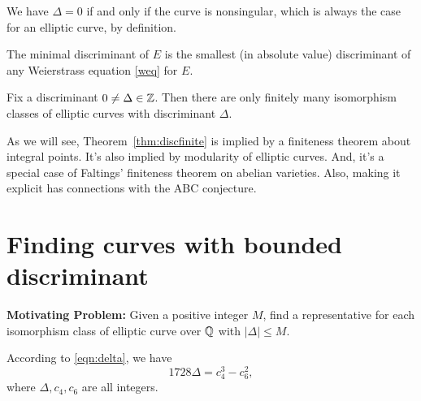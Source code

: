 \documentclass{book}
\begin{document}
We have $\Delta=0$ if and only if the curve is nonsingular, which is
always the case for an elliptic curve, by definition.

\begin{definition}
The minimal discriminant of $E$ is the smallest (in absolute
value) discriminant of any Weierstrass equation \eqref{weq}
for $E$.
\end{definition}


\begin{theorem}\label{thm:discfinite}
Fix a discriminant $0\neq \Delta\in\mathbb{Z}$.
Then there are only finitely many isomorphism classes
of elliptic curves with discriminant $\Delta$.
\end{theorem}
As we will see, Theorem~\ref{thm:discfinite} is
implied by a finiteness theorem about integral
points.  It's also implied by modularity of elliptic curves.
And, it's a special case of Faltings' finiteness
theorem on abelian varieties. Also, making it explicit
has connections with the ABC conjecture.

\section{Finding curves with bounded discriminant}

{\bf Motivating Problem: } Given a positive integer $M$, find
a representative for each
isomorphism class of elliptic curve over $\mathbb{Q}$
with $|\Delta|\leq M$.

According to \eqref{eqn:delta}, we have
\begin{equation}\label{eqn:deltac4c6}
1728\Delta = c_4^3 - c_6^2,
\end{equation}
where $\Delta, c_4, c_6$ are all integers.
\end{document}

